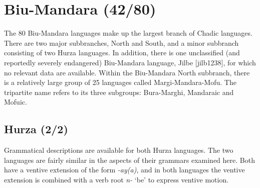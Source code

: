 \chapter{Biu-Mandara (42/80)}

The 80 Biu-Mandara languages make up the largest branch of Chadic languages. There are two major subbranches, North and South, and a minor subbranch consisting of two Hurza languages. In addition, there is one unclassified (and reportedly severely endangered) Biu-Mandara language, Jilbe [jilb1238], for which no relevant data are available. Within the Biu-Mandara North subbranch, there is a relatively large group of 25 languages called Margi-Mandara-Mofu. The tripartite name refers to its three subgroups: Bura-Marghi, Mandaraic and Mofuic. 

\section{Hurza (2/2)}

Grammatical descriptions are available for both Hurza languages. The two languages are fairly similar in the aspects of their grammars examined here. Both have a ventive extension of the form \textit{-ay(a)}, and in both languages the ventive extension is combined with a verb root \textit{n-} `be' to express ventive motion. %


